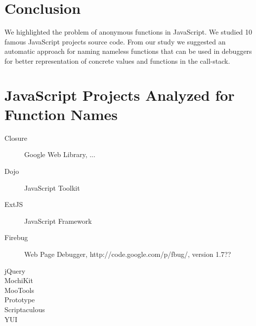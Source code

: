 \documentclass[10pt, preprint]{sigplanconf}
\begin{document}

\section{Conclusion}
We highlighted the problem of anonymous functions in JavaScript. We studied 10 famous JavaScript projects source code. From
our study we suggested an automatic approach for naming nameless functions that can be used in debuggers for better representation of concrete
values and functions in the call-stack.


\appendix
\section{JavaScript Projects Analyzed for Function Names}
\begin{description}
\item[Closure] Google Web Library, ...
\item[Dojo] JavaScript Toolkit
\item[ExtJS] JavaScript Framework
\item[Firebug] Web Page Debugger, http://code.google.com/p/fbug/, version 1.7??
\item[jQuery]
\item[MochiKit]
\item[MooTools]
\item[Prototype]
\item[Scriptaculous]
\item[YUI]
\end{description}






%
\end{document}
